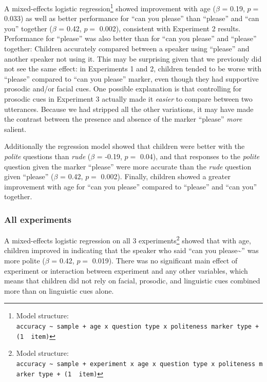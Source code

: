 \documentclass[10pt, letterpaper]{article}
\begin{document}
A mixed-effects logistic regression\footnote{Model structure:
  \texttt{accuracy\ \textasciitilde{}\ sample\ +\ age\ x\ question\ type\ x\ politeness\ marker\ type\ +\ (1\ \textbar{}\ item)}}
showed improvement with age (\(\beta\) = 0.19, \(p =\) 0.033) as well as
better performance for ``can you please'' than ``please'' and ``can
you'' together (\(\beta\) = 0.42, \(p =\) 0.002), consistent with
Experiment 2 results. Performance for ``please'' was also better than
for ``can you please'' and ``please'' together: Children accurately
compared between a speaker using ``please'' and another speaker not
using it. This may be surprising given that we previously did not see
the same effect: in Experiments 1 and 2, children tended to be worse
with ``please'' compared to ``can you please'' marker, even though they
had supportive prosodic and/or facial cues. One possible explanation is
that controlling for prosodic cues in Experiment 3 actually made it
\emph{easier} to compare between two utterances. Because we had stripped
all the other variations, it may have made the contrast between the
presence and absence of the marker ``please'' \emph{more} salient.

Additionally the regression model showed that children were better with
the \emph{polite} questions than \emph{rude} (\(\beta\) = -0.19, \(p =\)
0.04), and that responses to the \emph{polite} question given the marker
``please'' were more accurate than the \emph{rude} question given
``please'' (\(\beta\) = 0.42, \(p =\) 0.002). Finally, children showed a
greater improvement with age for ``can you please'' compared to
``please'' and ``can you'' together.

\subsubsection{All experiments}\label{all-experiments}

A mixed-effects logistic regression on all 3 experiments\footnote{Model
  structure:
  \texttt{accuracy\ \textasciitilde{}\ sample\ +\ experiment\ x\ age\ x\ question\ type\ x\ politeness\ marker\ type\ +\ (1\ \textbar{}\ item)}}
showed that with age, children improved in indicating that the speaker
who said ``can you please\textasciitilde{}'' was more polite (\(\beta\)
= 0.42, \(p =\) 0.019). There was no significant main effect of
experiment or interaction between experiment and any other variables,
which means that children did not rely on facial, prosodic, and
linguistic cues combined more than on linguistic cues alone.
\end{document}
